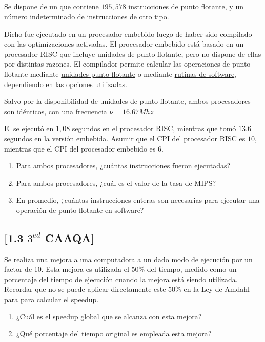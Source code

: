 \subsection{}
Se dispone de un \BMRK que contiene $195,578$ instrucciones de punto flotante, y un número indeterminado de instrucciones de otro tipo.
	
Dicho \BMRK fue ejecutado en un procesador embebido luego de haber sido compilado con las optimizaciones activadas. El procesador embebido está basado en un procesador RISC que incluye unidades de punto flotante, pero no dispone de ellas por distintas razones. El compilador permite calcular las operaciones de punto flotante mediante \underline{unidades punto flotante} o mediante \underline{rutinas de software}, dependiendo en las opciones utilizadas.

Salvo por la disponibilidad de unidades de punto flotante, ambos procesadores son idénticos, con una frecuencia $\nu = 16.67 Mhz$
	
El \BMRK se ejecutó en $1,08$ segundos en el procesador RISC, mientras que tomó $13.6$ segundos en la versión embebida. Asumir que el CPI del procesador RISC es $10$, mientras que el CPI del procesador embebido es $6$.
	
\begin{enumerate}[label=\alph*)]
\item Para ambos procesadores, ¿cuántas instrucciones fueron ejecutadas?
\item Para ambos procesadores, ¿cuál es el valor de la tasa de MIPS?
\item En promedio, ¿cuántas instrucciones enteras son necesarias para ejecutar una operación de punto flotante en software?
\end{enumerate}

\subsection{[1.3 $3^{ed}$ CAAQA]}
Se realiza una mejora a una computadora a un dado modo de ejecución por un factor de 10. Esta mejora es utilizada el 50\% del tiempo, medido como un porcentaje del tiempo de ejecución cuando la mejora está siendo utilizada. Recordar que no se puede aplicar directamente este 50\% en la Ley de Amdahl para para calcular el speedup.

\begin{enumerate}
 \item ¿Cuál es el speedup global que se alcanza con esta mejora?
 \item ¿Qué porcentaje del tiempo original es empleada esta mejora?
\end{enumerate}


